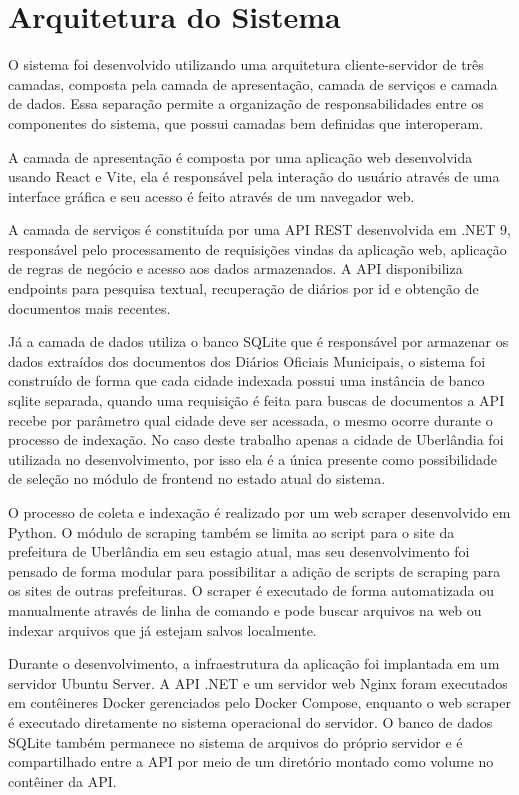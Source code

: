 \section{Arquitetura do Sistema}
O sistema foi desenvolvido utilizando uma arquitetura cliente-servidor de três camadas, composta pela camada de apresentação, camada de serviços e camada de dados. Essa separação permite a organização de responsabilidades entre os componentes do sistema, que possui camadas bem definidas que interoperam.

A camada de apresentação é composta por uma aplicação web desenvolvida usando React e Vite, ela é responsável pela interação do usuário através de uma interface gráfica e seu acesso é feito através de um navegador web.

A camada de serviços é constituída por uma API REST desenvolvida em .NET 9, responsável pelo processamento de requisições vindas da aplicação web, aplicação de regras de negócio e acesso aos dados armazenados. A API disponibiliza endpoints para pesquisa textual, recuperação de diários por id e obtenção de documentos mais recentes.

Já a camada de dados utiliza o banco SQLite que é responsável por armazenar os dados extraídos dos documentos dos Diários Oficiais Municipais, o sistema foi construído de forma que cada cidade indexada possui uma instância de banco sqlite separada, quando uma requisição é feita para buscas de documentos a API recebe por parâmetro qual cidade deve ser acessada, o mesmo ocorre durante o processo de indexação. No caso deste trabalho apenas a cidade de Uberlândia foi utilizada no desenvolvimento, por isso ela é a única presente como possibilidade de seleção no módulo de frontend no estado atual do sistema.

O processo de coleta e indexação é realizado por um web scraper desenvolvido em Python. O módulo de scraping também se limita ao script para o site da prefeitura de Uberlândia em seu estagio atual, mas seu desenvolvimento foi pensado de forma modular para possibilitar a adição de scripts de scraping para os sites de outras prefeituras. O scraper é executado de forma automatizada ou manualmente através de linha de comando e pode buscar arquivos na web ou indexar arquivos que já estejam salvos localmente.

Durante o desenvolvimento, a infraestrutura da aplicação foi implantada em um servidor Ubuntu Server. A API .NET e um servidor web Nginx foram executados em contêineres Docker gerenciados pelo Docker Compose, enquanto o web scraper é executado diretamente no sistema operacional do servidor. O banco de dados SQLite também permanece no sistema de arquivos do próprio servidor e é compartilhado entre a API por meio de um diretório montado como volume no contêiner da API.

